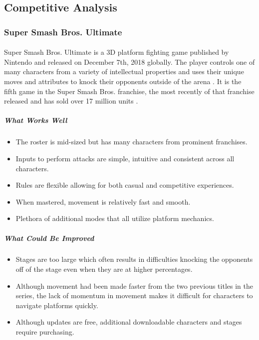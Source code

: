 \subsection{Competitive Analysis}

\subsubsection{Super Smash Bros. Ultimate}

\paragraph{} Super Smash Bros. Ultimate is a 3D platform fighting game published by Nintendo and released on December 7th, 2018 globally. The player controls one of many characters from a variety of intellectual properties and uses their unique moves and attributes to knock their opponents outside of the arena \autocite{sakurai_super_2018}. It is the fifth game in the Super Smash Bros. franchise, the most recently of that franchise released and has sold over 17 million units  \autocite{nintendo_ir_nodate}.

\subparagraph{What Works Well}

\begin{itemize}
    \item The roster is mid-sized but has many characters from prominent franchises.
    \item Inputs to perform attacks are simple, intuitive and consistent across all characters.
    \item Rules are flexible allowing for both casual and competitive experiences.
    \item When mastered, movement is relatively fast and smooth.
    \item Plethora of additional modes that all utilize platform mechanics.
\end{itemize}

\subparagraph{What Could Be Improved}

\begin{itemize}
    \item Stages are too large which often results in difficulties knocking the opponents off of the stage even when they are at higher percentages.
    \item Although movement had been made faster from the two previous titles in the series, the lack of momentum in movement makes it difficult for characters to navigate platforms quickly.
    \item Although updates are free, additional downloadable characters and stages require purchasing.
\end{itemize}

